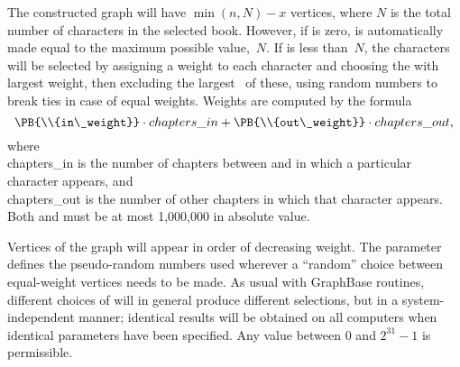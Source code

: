 The constructed graph will have $\min(n,N)-x$ vertices, where $N$ is the
total number of characters in the selected book.
However, if  is zero,  is automatically made equal to the
maximum
possible value,~$N$. If  is less than~$N$, the 
characters will be
selected by assigning  a weight to each character and choosing the 
with
largest weight, then excluding the largest~ of these,
using random numbers to break ties in case of equal weights.
Weights are computed by the formula
$$ \PB{\\{in\_weight}}\cdot\\{chapters\_in}+\PB{\\{out\_weight}}\cdot%
\\{chapters\_out}, $$
where \\{chapters\_in} is the number of chapters between 
and  in which a particular character appears, and
\\{chapters\_out} is the number of other chapters in which that
character appears. Both  and  must be at
most
1,000,000 in absolute value.

Vertices of the graph will appear in order of decreasing weight.
The  parameter defines the pseudo-random numbers used wherever
a ``random'' choice between equal-weight vertices needs to be made.
As usual with GraphBase routines, different choices of 
will in general produce different selections,
but in a system-independent manner; identical results will be obtained on
all computers when identical parameters have been specified.
Any  value between 0 and $2^{31}-1$ is permissible.

\fi

